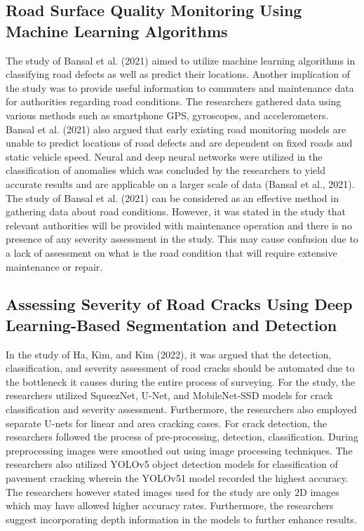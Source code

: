\subsection{Road Surface Quality Monitoring Using Machine Learning Algorithms}
The study of Bansal et al. (2021) aimed to utilize machine learning algorithms in classifying road defects as well as predict their locations. Another implication of the study was to provide useful information to commuters and maintenance data for authorities regarding road conditions. The researchers gathered data using various methods such as smartphone GPS, gyroscopes, and accelerometers. Bansal et al. (2021) also argued that early existing road monitoring models are unable to predict locations of road defects and are dependent on fixed roads and static vehicle speed.  Neural and deep neural networks were utilized in the classification of anomalies which was concluded by the researchers to yield accurate results and are applicable on a larger scale of data (Bansal et al., 2021). The study of Bansal et al. (2021) can be considered as an effective method in gathering data about road conditions. However, it was stated in the study that relevant authorities will be provided with maintenance operation and there is no presence of any severity assessment in the study. This may cause confusion due to a lack of assessment on what is the road condition that will require extensive maintenance or repair.


\subsection{Assessing Severity of Road Cracks Using Deep Learning-Based Segmentation and Detection}
In the study of Ha, Kim, and Kim (2022), it was argued that the detection, classification, and severity assessment of road cracks should be automated due to the bottleneck it causes during the entire process of surveying. For the study, the researchers utilized SqueezNet, U-Net, and MobileNet-SSD models for crack classification and severity assessment. Furthermore, the researchers also employed separate U-nets for linear and area cracking cases. For crack detection, the researchers followed the process of pre-processing, detection, classification. During preprocessing images were smoothed out using image processing techniques. The researchers also utilized YOLOv5 object detection models for classification of pavement cracking wherein the YOLOv51 model recorded the highest accuracy. The researchers however stated images used for the study are only 2D images which may have allowed higher accuracy rates. Furthermore, the researchers suggest incorporating depth information in the models to further enhance results.

